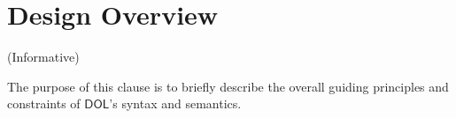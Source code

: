 \documentclass[10pt,fleqn,final]{scrreprt}
\makeatletter
\newcommand*\CommentAuthor{}
\renewcommand*\CommentAuthor{#1}}
\newcommand*\CommentDate{}
\renewcommand*\CommentDate{#1}}
\newcommand*\CommentId{}
\renewcommand*\CommentId{#1}}
\newcommand*\CommentType{}
\renewcommand*\CommentType{#1}}
\newcommand*{\SetCommentColorByType}[1]{%
\edef\localType{{#1}}%
\expandafter\ifstrequal\localType{q-aut}{\colorlet{CommentColor}{red}}{%
\expandafter\ifstrequal\localType{q-all}{\colorlet{CommentColor}{orange}}{%
\expandafter\ifstrequal\localType{todo}{\colorlet{CommentColor}{orange}}{%
\expandafter\ifstrequal\localType{fyi}{\colorlet{CommentColor}{lightgray}}{%
\colorlet{CommentColor}{yellow}}}}}}
\newcommand*{\SetCommentPrefixByType}[1]{%
\edef\localType{{#1}}%
\expandafter\@ifmtarg\localType{%
\edef\CommentPrefix{}%
}{%
\caseupper[q]{#1}%
\edef\CommentPrefix{\thestring: }%
}}
\newcommand*{\initComment}[1]{%
\setkeys{Comment}{#1}%
\SetCommentColorByType{\CommentType}%
\relax%
\SetCommentPrefixByType{\CommentType}%
\relax%
}
\newcommand*{\todonote}[2][]{%
\initComment{#1}%
\pdfcomment[author=\CommentAuthor,color=CommentColor,date=\CommentDate,id=\CommentId]{%
\CommentPrefix
#2}}
\renewcommand*{\todonote}[2][]{%
\initComment{#1}%
\ednote{\CommentPrefix #2}}
\newcommand*{\CLnote}[2][author=Christoph Lange]{%
\todonote[author=Christoph Lange,#1]{#2} 
}
\newcommand*{\shall}{\textbf{shall}\xspace}
\newcommand*{\should}{\textbf{should}\xspace}
\newcommand*{\IS}{OMG Specification\xspace}
\newcommand*{\DOL}{\ensuremath{\mathsf{DOL}}\xspace}
\newcommand{\informative}[0]{{\begin{center}{\Large{(Informative})}\end{center}} \bigskip}
\newcommand{\clauseI}[1]{\chapter{#1} \informative }
\newenvironment{definitions}[0]{\medskip }{}
\makeatother
\begin{document}
\begin{definitions}
\clauseI{Design Overview} \label{c:design}

%
%
%
The purpose of this clause is to briefly describe the 
 overall guiding principles and constraints of \DOL's syntax and semantics.
%
%
%
%
%
%
%

\end{definitions}
\end{document}
